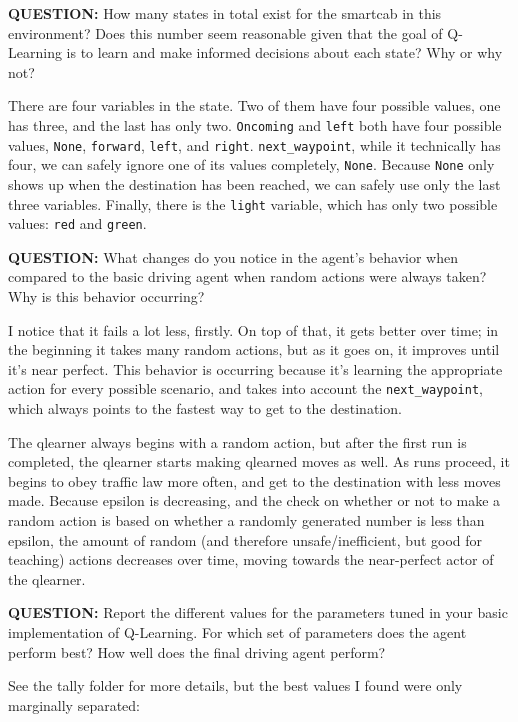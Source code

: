 \documentclass[11pt]{article}
\begin{document}
\noindent
\textbf{QUESTION:} How many states in total exist for the smartcab in this environment? Does this number seem reasonable given that the goal of Q-Learning is to learn and make informed decisions about each state? Why or why not?

There are four variables in the state. Two of them have four possible values, one has three, and the last has only two. \texttt{Oncoming} and \texttt{left} both have four possible values, \texttt{None}, \texttt{forward}, \texttt{left}, and \texttt{right}. \texttt{next\_waypoint}, while it technically has four, we can safely ignore one of its values completely, \texttt{None}. Because \texttt{None} only shows up when the destination has been reached, we can safely use only the last three variables. Finally, there is the \texttt{light} variable, which has only two possible values: \texttt{red} and \texttt{green}.

\noindent
\textbf{QUESTION:} What changes do you notice in the agent's behavior when compared to the basic driving agent when random actions were always taken? Why is this behavior occurring?

I notice that it fails a lot less, firstly. On top of that, it gets better over time; in the beginning it takes many random actions, but as it goes on, it improves until it's near perfect. This behavior is occurring because it's learning the appropriate action for every possible scenario, and takes into account the \texttt{next\_waypoint}, which always points to the fastest way to get to the destination.

The qlearner always begins with a random action, but after the first run is completed, the qlearner starts making qlearned moves as well. As runs proceed, it begins to obey traffic law more often, and get to the destination with less moves made. Because epsilon is decreasing, and the check on whether or not to make a random action is based on whether a randomly generated number is less than epsilon, the amount of random (and therefore unsafe/inefficient, but good for teaching) actions decreases over time, moving towards the near-perfect actor of the qlearner.

\noindent
\textbf{QUESTION:} Report the different values for the parameters tuned in your basic implementation of Q-Learning. For which set of parameters does the agent perform best? How well does the final driving agent perform?

See the tally folder for more details, but the best values I found were only marginally separated:
\end{document}
